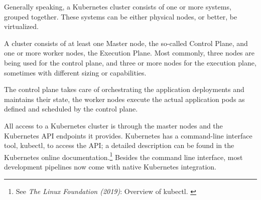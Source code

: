 Generally speaking, a Kubernetes cluster consists of one or more systems, grouped together. These systems can be either physical nodes, or better, be virtualized.

A cluster consists of at least one Master node, the so-called Control Plane, and one or more worker nodes, the Execution Plane. Most commonly, three nodes are being used for the control plane, and three or more nodes for the execution plane, sometimes with different sizing or capabilities.

The control plane takes care of orchestrating the application deployments and maintains their state, the worker nodes execute the actual application pods as defined and scheduled by the control plane.

All access to a Kubernetes cluster is through the master nodes and the Kubernetes API endpoints it provides. Kubernetes has a command-line interface tool, kubectl, to access the API; a detailed description can be found in the Kubernetes online documentation.\footnote{See \textit{The Linux Foundation (2019)}: Overview of kubectl. \cite{kubectl}} Besides the command line interface, most development pipelines now come with native Kubernetes integration.
